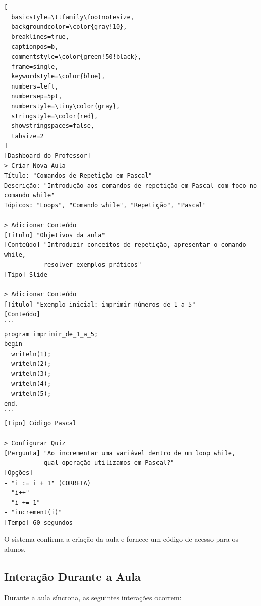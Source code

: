 \begin{lstlisting}[
  basicstyle=\ttfamily\footnotesize,
  backgroundcolor=\color{gray!10},
  breaklines=true,
  captionpos=b,
  commentstyle=\color{green!50!black},
  frame=single,
  keywordstyle=\color{blue},
  numbers=left,
  numbersep=5pt,
  numberstyle=\tiny\color{gray},
  stringstyle=\color{red},
  showstringspaces=false,
  tabsize=2
]
[Dashboard do Professor]
> Criar Nova Aula
Título: "Comandos de Repetição em Pascal"
Descrição: "Introdução aos comandos de repetição em Pascal com foco no comando while"
Tópicos: "Loops", "Comando while", "Repetição", "Pascal"

> Adicionar Conteúdo
[Título] "Objetivos da aula"
[Conteúdo] "Introduzir conceitos de repetição, apresentar o comando while, 
           resolver exemplos práticos"
[Tipo] Slide

> Adicionar Conteúdo
[Título] "Exemplo inicial: imprimir números de 1 a 5"
[Conteúdo] 
```
program imprimir_de_1_a_5;
begin
  writeln(1);
  writeln(2);
  writeln(3);
  writeln(4);
  writeln(5);
end.
```
[Tipo] Código Pascal

> Configurar Quiz
[Pergunta] "Ao incrementar uma variável dentro de um loop while, 
           qual operação utilizamos em Pascal?"
[Opções] 
- "i := i + 1" (CORRETA)
- "i++"
- "i += 1"
- "increment(i)"
[Tempo] 60 segundos
\end{lstlisting}

O sistema confirma a criação da aula e fornece um código de acesso para os alunos.


\subsection{Interação Durante a Aula}
\label{subsec:interacao}

Durante a aula síncrona, as seguintes interações ocorrem:

